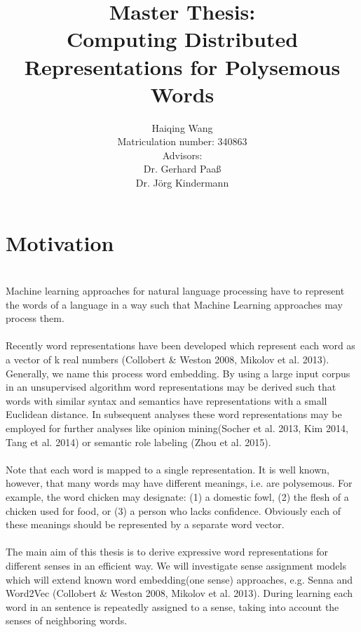 \documentclass{scrartcl}
\begin{document}
\title{Master Thesis:\\ Computing Distributed Representations for Polysemous Words}
\author{Haiqing Wang \\Matriculation number: 340863 \\ Advisors:  \\ Dr. Gerhard Paaß \\ Dr. Jörg Kindermann \\ }
\maketitle

\section{Motivation}
\paragraph{}
\hfill \\
Machine learning approaches for natural language processing have to represent the words of a language in a way such that Machine Learning approaches may process them. \\
\\
Recently word representations have been developed which represent each word as a vector of k real numbers (Collobert \& Weston 2008, Mikolov et al. 2013). Generally, we name this process word embedding. By using a large input corpus in an unsupervised algorithm word representations may be derived such that words with similar syntax and semantics have representations with a small Euclidean distance. In subsequent analyses these word representations may be employed for further analyses like opinion mining(Socher et al. 2013, Kim 2014, Tang et al. 2014) or semantic role labeling (Zhou et al. 2015).\\
\\
Note that each word is mapped to a single representation. It is well known, however, that many words may have different meanings, i.e. are polysemous. For example, the word chicken may designate: (1) a domestic fowl, (2) the flesh of a chicken used for food, or (3) a person who lacks confidence. Obviously each of these meanings should be represented by a separate word vector.\\
\\
The main aim of this thesis is to derive expressive word representations for different senses in an efficient way. We will investigate sense assignment models which will extend known word embedding(one sense) approaches, e.g. Senna and Word2Vec (Collobert \& Weston 2008, Mikolov et al. 2013). During learning each word in an sentence is repeatedly assigned to a sense, taking into account the senses of neighboring words. \\
\end{document}
